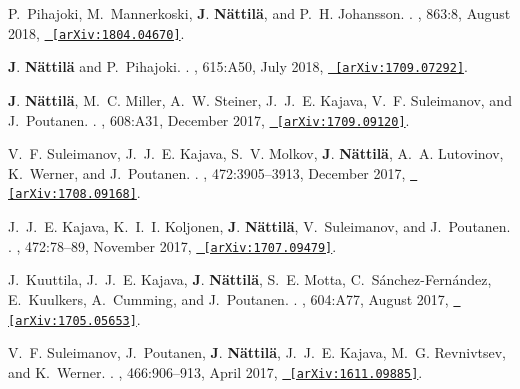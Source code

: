 \documentclass[letterpaper, onecolumn, 11pt]{article}
\begin{document}
\begin{thebibliography}{10}
P.~{Pihajoki}, M.~{Mannerkoski}, \textbf{J}. \textbf{{N{\"a}ttil{\"a}}}, and
  P.~H. {Johansson}.
.
\newblock {\em \apj}, 863:8, August 2018,
  \href{http://arxiv.org/abs/1804.04670}{\nolinkurl{ [arXiv:1804.04670]}}.

\textbf{J}. \textbf{{N{\"a}ttil{\"a}}} and P.~{Pihajoki}.
.
\newblock {\em \aap}, 615:A50, July 2018,
  \href{http://arxiv.org/abs/1709.07292}{\nolinkurl{ [arXiv:1709.07292]}}.

\textbf{J}. \textbf{{N{\"a}ttil{\"a}}}, M.~C. {Miller}, A.~W. {Steiner},
  J.~J.~E. {Kajava}, V.~F. {Suleimanov}, and J.~{Poutanen}.
.
\newblock {\em \aap}, 608:A31, December 2017,
  \href{http://arxiv.org/abs/1709.09120}{\nolinkurl{ [arXiv:1709.09120]}}.

V.~F. {Suleimanov}, J.~J.~E. {Kajava}, S.~V. {Molkov}, \textbf{J}.
  \textbf{{N{\"a}ttil{\"a}}}, A.~A. {Lutovinov}, K.~{Werner}, and
  J.~{Poutanen}.
.
\newblock {\em \mnras}, 472:3905--3913, December 2017,
  \href{http://arxiv.org/abs/1708.09168}{\nolinkurl{ [arXiv:1708.09168]}}.

J.~J.~E. {Kajava}, K.~I.~I. {Koljonen}, \textbf{J}. \textbf{N{\"a}ttil{\"a}},
  V.~{Suleimanov}, and J.~{Poutanen}.
.
\newblock {\em \mnras}, 472:78--89, November 2017,
  \href{http://arxiv.org/abs/1707.09479}{\nolinkurl{ [arXiv:1707.09479]}}.

J.~{Kuuttila}, J.~J.~E. {Kajava}, \textbf{J}. \textbf{{N{\"a}ttil{\"a}}}, S.~E.
  {Motta}, C.~{S{\'a}nchez-Fern{\'a}ndez}, E.~{Kuulkers}, A.~{Cumming}, and
  J.~{Poutanen}.
.
\newblock {\em \aap}, 604:A77, August 2017,
  \href{http://arxiv.org/abs/1705.05653}{\nolinkurl{ [arXiv:1705.05653]}}.

V.~F. {Suleimanov}, J.~{Poutanen}, \textbf{J}. \textbf{N{\"a}ttil{\"a}},
  J.~J.~E. {Kajava}, M.~G. {Revnivtsev}, and K.~{Werner}.
.
\newblock {\em \mnras}, 466:906--913, April 2017,
  \href{http://arxiv.org/abs/1611.09885}{\nolinkurl{ [arXiv:1611.09885]}}.


\end{thebibliography}
\end{document}
